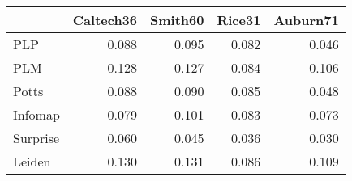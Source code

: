 \begin{tabular}{lrrrr}
\toprule
{} & Caltech36 & Smith60 & Rice31 & Auburn71 \\
\midrule
PLP      &     0.088 &   0.095 &  0.082 &    0.046 \\
PLM      &     0.128 &   0.127 &  0.084 &    0.106 \\
Potts    &     0.088 &   0.090 &  0.085 &    0.048 \\
Infomap  &     0.079 &   0.101 &  0.083 &    0.073 \\
Surprise &     0.060 &   0.045 &  0.036 &    0.030 \\
Leiden   &     0.130 &   0.131 &  0.086 &    0.109 \\
\bottomrule
\end{tabular}
